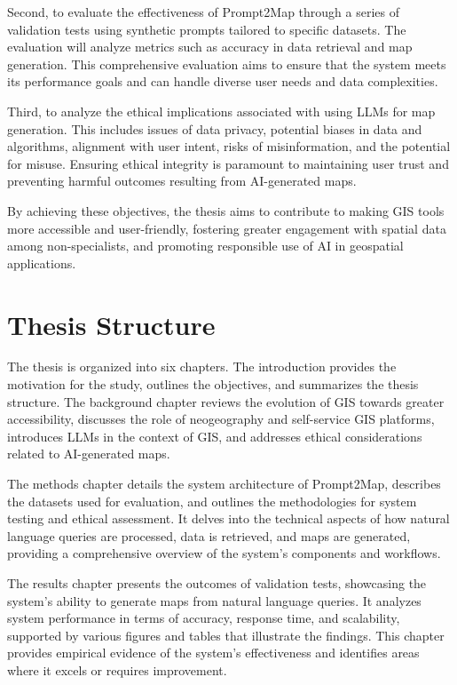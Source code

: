 Second, to evaluate the effectiveness of Prompt2Map through a series of validation tests using synthetic prompts tailored to specific datasets. The evaluation will analyze metrics such as accuracy in data retrieval and map generation. This comprehensive evaluation aims to ensure that the system meets its performance goals and can handle diverse user needs and data complexities.

Third, to analyze the ethical implications associated with using LLMs for map generation. This includes issues of data privacy, potential biases in data and algorithms, alignment with user intent, risks of misinformation, and the potential for misuse. Ensuring ethical integrity is paramount to maintaining user trust and preventing harmful outcomes resulting from AI-generated maps.

By achieving these objectives, the thesis aims to contribute to making GIS tools more accessible and user-friendly, fostering greater engagement with spatial data among non-specialists, and promoting responsible use of AI in geospatial applications.

\section{Thesis Structure}

The thesis is organized into six chapters. The introduction provides the motivation for the study, outlines the objectives, and summarizes the thesis structure. The background chapter reviews the evolution of GIS towards greater accessibility, discusses the role of neogeography and self-service GIS platforms, introduces LLMs in the context of GIS, and addresses ethical considerations related to AI-generated maps.

The methods chapter details the system architecture of Prompt2Map, describes the datasets used for evaluation, and outlines the methodologies for system testing and ethical assessment. It delves into the technical aspects of how natural language queries are processed, data is retrieved, and maps are generated, providing a comprehensive overview of the system's components and workflows.

The results chapter presents the outcomes of validation tests, showcasing the system's ability to generate maps from natural language queries. It analyzes system performance in terms of accuracy, response time, and scalability, supported by various figures and tables that illustrate the findings. This chapter provides empirical evidence of the system's effectiveness and identifies areas where it excels or requires improvement.


